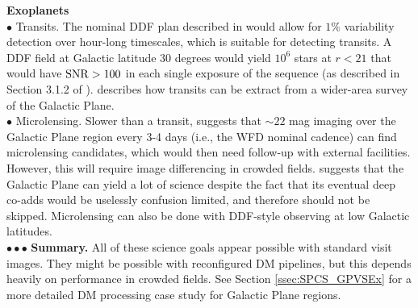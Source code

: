 \documentclass[DM,lsstdraft,toc]{lsstdoc}
\begin{document}
\noindent \textbf{Exoplanets} \\ 
$\bullet$ Transits. The nominal DDF plan described in \cite{2008arXiv0805.2366I} would allow for $1\%$ variability detection over hour-long timescales, which is suitable for detecting transits. A DDF field at Galactic latitude $30$ degrees would yield $10^6$ stars at $r<21$ that would have ${\rm SNR}>100$ in each single exposure of the sequence (as described in Section 3.1.2 of \cite{2008arXiv0805.2366I}). \cite{2013arXiv1304.3455G} describes how transits can be extract from a wider-area survey of the Galactic Plane.\\
$\bullet$ Microlensing.  Slower than a transit, \cite{2013arXiv1304.3455G} suggests that $\sim22$ mag imaging over the Galactic Plane region every 3-4 days (i.e., the WFD nominal cadence) can find microlensing candidates, which would then need follow-up with external facilities. However, this will require image differencing in crowded fields. \cite{2013arXiv1304.3455G} suggests that the Galactic Plane can yield a lot of science despite the fact that its eventual deep co-adds would be uselessly confusion limited, and therefore should not be skipped. Microlensing can also be done with DDF-style observing at low Galactic latitudes. \\
$\bullet \bullet \bullet$ {\bf Summary.} All of these science goals appear possible with standard visit images. They might be possible with reconfigured DM pipelines, but this depends heavily on performance in crowded fields. See Section \ref{ssec:SPCS_GPVSEx} for a more detailed DM processing case study for Galactic Plane regions.
\end{document}
